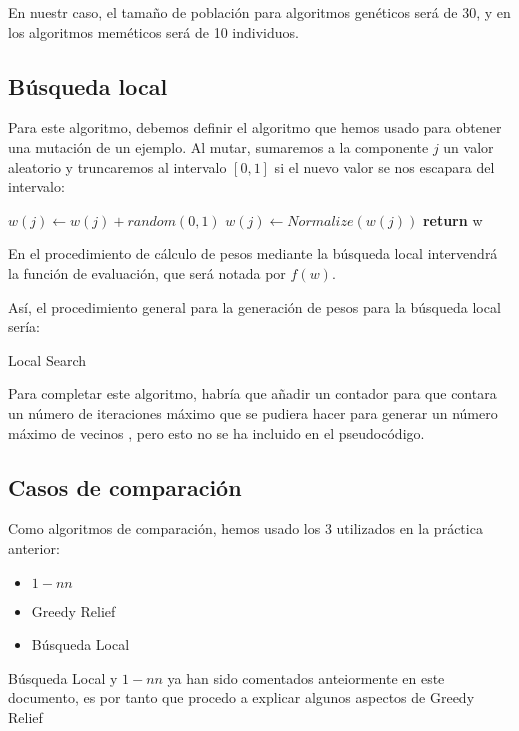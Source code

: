 \documentclass[11pt]{article}
\makeatletter
\def\BState{\State\hskip-\ALG@thistlm}
\makeatother
\begin{document}
En nuestr caso, el tamaño de población para algoritmos genéticos será de 30, y en los algoritmos meméticos será de 10 individuos.

\subsection{Búsqueda local}
Para este algoritmo, debemos definir el algoritmo que hemos usado para obtener una mutación de un ejemplo. Al mutar, sumaremos a la componente $j$ un valor aleatorio y truncaremos al intervalo $[0,1]$ si el nuevo valor se nos escapara del intervalo:
\begin{algorithmic}[1]
\State $w(j) \gets w(j) + random(0,1)$
\State $w(j) \gets Normalize(w(j))$
\State \textbf{return} w
\EndProcedure
\end{algorithmic}
En el procedimiento de cálculo de pesos mediante la búsqueda local intervendrá la función de evaluación, que será notada por $f(w)$.

Así, el procedimiento general para la generación de pesos para la búsqueda local sería:


\begin{algorithm}
\caption{Local Search}\label{euclid}
\end{algorithm}

Para completar este algoritmo, habría que añadir un contador para que contara un número de iteraciones máximo que se pudiera hacer para generar un número máximo de vecinos , pero esto no se ha incluido en el pseudocódigo.

\subsection{Casos de comparación}
Como algoritmos de comparación, hemos usado los 3 utilizados en la práctica anterior:
\begin{itemize}
	\item $1-nn$
	\item Greedy Relief
	\item Búsqueda Local
\end{itemize}
Búsqueda Local y $1-nn$ ya han sido comentados anteiormente en este documento, es por tanto que procedo a explicar algunos aspectos de Greedy Relief
\end{document}
